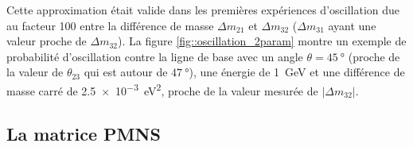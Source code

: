            Cette approximation était valide dans les premières expériences d'oscillation due au facteur 100 entre la différence de masse $\Delta m_{21}$ et $\Delta m_{32}$ ($\Delta m_{31}$ ayant une valeur proche de $\Delta m_{32}$). La figure \autoref{fig::oscillation_2param} montre un exemple de probabilité d'oscillation contre la ligne de base avec un angle $\theta=\SI{45}{\degree}$ (proche de la valeur de $\theta_{23}$ qui est autour de $\SI{47}{\degree}$), une énergie de \SI{1}{\giga\electronvolt} et une différence de masse carré de \SI{2.5e-3}{\electronvolt\squared}, proche de la valeur mesurée de $|\Delta m_{32}|$.
            
        \subsection{La matrice PMNS}\label{sec::oscillations}
